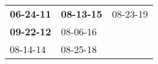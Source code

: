 \begin{supertabular}{p{0.33\columnwidth}p{0.33\columnwidth}p{0.33\columnwidth}}
 \textbf{06-24-11\textsuperscript{}} &  \textbf{08-13-15\textsuperscript{}} &  08-23-19\textsuperscript{} \\
 \textbf{09-22-12\textsuperscript{}} &           08-06-16\textsuperscript{} &                             \\
          08-14-14\textsuperscript{} &           08-25-18\textsuperscript{} &                             \\
\end{supertabular}
